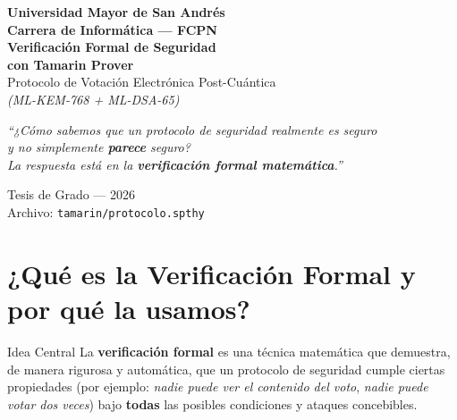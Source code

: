 \documentclass[12pt, a4paper]{article}
\begin{document}

\begin{titlepage}
  \centering
  \vspace*{1.5cm}
  {\Large\bfseries\color{azulPQC}
    Universidad Mayor de San Andrés\\[0.3em]
    Carrera de Informática — FCPN}\\[2cm]

  {\Huge\bfseries Verificación Formal de Seguridad\\[0.5em]
   con Tamarin Prover}\\[1em]

  {\large\color{gray}
    Protocolo de Votación Electrónica Post-Cuántica\\
    \textit{(ML-KEM-768 + ML-DSA-65)}}\\[2.5cm]

  \begin{tcolorbox}[colback=azulClaro, colframe=azulPQC, width=0.82\textwidth,
                    boxrule=1pt, arc=8pt]
    \centering\itshape
    ``¿Cómo sabemos que un protocolo de seguridad realmente es seguro\\
    y no simplemente \textbf{parece} seguro?\\[0.5em]
    La respuesta está en la \textbf{verificación formal matemática}.''
  \end{tcolorbox}

  \vfill
  {\large Tesis de Grado — 2026}\\[0.5em]
  {\small Archivo: \texttt{tamarin/protocolo.spthy}}
\end{titlepage}

\tableofcontents
\newpage

\section{¿Qué es la Verificación Formal y por qué la usamos?}

\begin{cajaConceto}{Idea Central}
La \textbf{verificación formal} es una técnica matemática que demuestra,
de manera rigurosa y automática, que un protocolo de seguridad cumple ciertas
propiedades (por ejemplo: \textit{nadie puede ver el contenido del voto},
\textit{nadie puede votar dos veces}) bajo \textbf{todas} las posibles
condiciones y ataques concebibles.
\end{cajaConceto}
\end{document}
